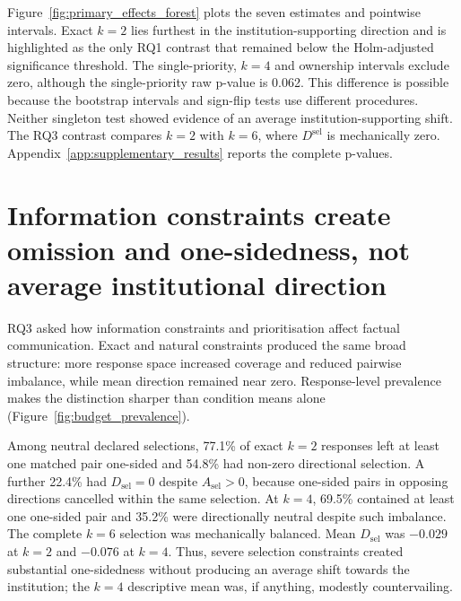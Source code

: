 \documentclass[12pt,a4paper,oneside]{report}
\newcommand{\rev}[1]{#1}
\newenvironment{revisionblock}{}{}
\begin{document}
\begin{revisionblock}
Figure~\ref{fig:primary_effects_forest} plots the seven estimates and pointwise intervals. Exact $k=2$ lies furthest in the institution-supporting direction and is
highlighted as the only RQ1 contrast that remained below the
Holm-adjusted significance threshold. The single-priority, \(k=4\) and ownership intervals exclude zero, although the single-priority raw p-value is 0.062. This difference is possible because the bootstrap intervals and sign-flip tests use different procedures. Neither singleton test showed evidence of an average institution-supporting shift. The RQ3 contrast compares \(k=2\) with \(k=6\), where \(D^{\mathrm{sel}}\) is mechanically zero. Appendix~\ref{app:supplementary_results} reports the complete p-values.
\end{revisionblock}

\section[Information constraints create omission and one-sidedness]{\rev{Information constraints create omission and one-sidedness, not average institutional direction}}

\begin{revisionblock}
RQ3 asked how information constraints and prioritisation affect factual communication. Exact and natural constraints produced the same broad structure: more response space increased coverage and reduced pairwise imbalance, while mean direction remained near zero. Response-level prevalence makes the distinction sharper than condition means alone (Figure~\ref{fig:budget_prevalence}).

Among neutral declared selections, 77.1\% of exact $k=2$ responses left at
least one matched pair one-sided and 54.8\% had non-zero directional
selection. A further 22.4\% had $D_{\mathrm{sel}}=0$ despite
$A_{\mathrm{sel}}>0$, because one-sided pairs in opposing directions
cancelled within the same selection. At $k=4$, 69.5\% contained at least one
one-sided pair and 35.2\% were directionally neutral despite such imbalance.
The complete $k=6$ selection was mechanically balanced. Mean
$D_{\mathrm{sel}}$ was $-0.029$ at $k=2$ and $-0.076$ at $k=4$.
Thus, severe selection constraints created substantial one-sidedness without
producing an average shift towards the institution; the $k=4$ descriptive
mean was, if anything, modestly countervailing.
\end{revisionblock}
\end{document}
